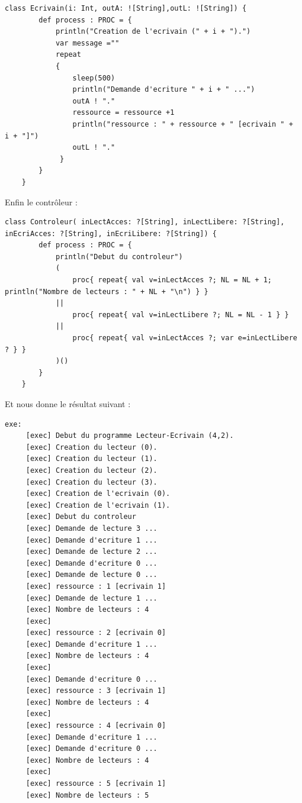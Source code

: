 \documentclass[a4paper,11pt,french]{report}
\begin{document}
\begin{lstlisting}[frame=trBL, title="Lecteur-\'Ecrivain : \'Ecrivain", firstnumber=last]
	class Ecrivain(i: Int, outA: ![String],outL: ![String]) {
        def process : PROC = {
            println("Creation de l'ecrivain (" + i + ").")
            var message =""
            repeat
            {
                sleep(500)
                println("Demande d'ecriture " + i + " ...")
                outA ! "."
                ressource = ressource +1
                println("ressource : " + ressource + " [ecrivain " +  i + "]")
                outL ! "."
             }
        }
    }  
\end{lstlisting}

Enfin le contrôleur :

\begin{lstlisting}[frame=trBL, title="Lecteur-\'Ecrivain : \'Ecrivain", firstnumber=last]
    class Controleur( inLectAcces: ?[String], inLectLibere: ?[String], inEcriAcces: ?[String], inEcriLibere: ?[String]) {
        def process : PROC = {
            println("Debut du controleur")
            (
                proc{ repeat{ val v=inLectAcces ?; NL = NL + 1; println("Nombre de lecteurs : " + NL + "\n") } }
            ||
                proc{ repeat{ val v=inLectLibere ?; NL = NL - 1 } }
            ||
                proc{ repeat{ val v=inLectAcces ?; var e=inLectLibere ? } }     
            )()
        }
    }
\end{lstlisting}

Et nous donne le résultat suivant :

\begin{lstlisting}[frame=trBL, title="Lecteur-\'Ecrivain : Résultats"]
exe:
     [exec] Debut du programme Lecteur-Ecrivain (4,2).
     [exec] Creation du lecteur (0).
     [exec] Creation du lecteur (1).
     [exec] Creation du lecteur (2).
     [exec] Creation du lecteur (3).
     [exec] Creation de l'ecrivain (0).
     [exec] Creation de l'ecrivain (1).
     [exec] Debut du controleur
     [exec] Demande de lecture 3 ...
     [exec] Demande d'ecriture 1 ...
     [exec] Demande de lecture 2 ...
     [exec] Demande d'ecriture 0 ...
     [exec] Demande de lecture 0 ...
     [exec] ressource : 1 [ecrivain 1]
     [exec] Demande de lecture 1 ...
     [exec] Nombre de lecteurs : 4
     [exec] 
     [exec] ressource : 2 [ecrivain 0]
     [exec] Demande d'ecriture 1 ...
     [exec] Nombre de lecteurs : 4
     [exec] 
     [exec] Demande d'ecriture 0 ...
     [exec] ressource : 3 [ecrivain 1]
     [exec] Nombre de lecteurs : 4
     [exec] 
     [exec] ressource : 4 [ecrivain 0]
     [exec] Demande d'ecriture 1 ...
     [exec] Demande d'ecriture 0 ...
     [exec] Nombre de lecteurs : 4
     [exec] 
     [exec] ressource : 5 [ecrivain 1]
     [exec] Nombre de lecteurs : 5
\end{lstlisting}
\end{document}
